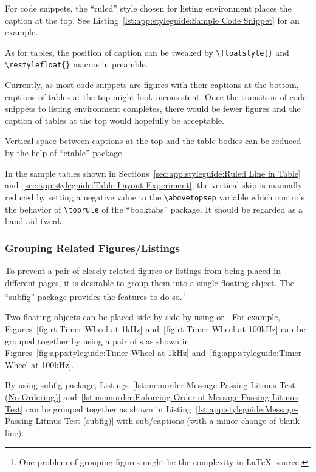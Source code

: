 For code snippets, the ``ruled'' style chosen for listing
environment places the caption at the top.
See Listing~\ref{lst:app:styleguide:Sample Code Snippet}
for an example.

As for tables, the position of caption can be tweaked by
\verb|\floatstyle{}| and \verb|\restylefloat{}| macros
in preamble.

Currently, as most code snippets are figures with their captions
at the bottom, captions of tables at the top might look inconsistent.
Once the transition of code snippets to listing environment
completes, there would be fewer figures and the caption of tables
at the top would hopefully be acceptable.

Vertical space between captions at the top and the table bodies
can be reduced by the help of ``ctable'' package.

In the sample tables shown in
Sections~\ref{sec:app:styleguide:Ruled Line in Table}
and~\ref{sec:app:styleguide:Table Layout Experiment},
the vertical skip is manually reduced by setting a negative value to the
\verb|\abovetopsep| variable which controls the behavior of
\verb|\toprule| of the ``booktabs'' package.
It should be regarded as a band-aid tweak.

\subsubsection{Grouping Related Figures/Listings}
\label{sec:app:styleguide:Grouping Related Figures/Listings}

To prevent a pair of closely related figures or listings
from being placed in different pages, it is desirable to group
them into a single floating object.
The ``subfig'' package provides the features to do so.\footnote{
  One problem of grouping figures might be the complexity in
  \LaTeX\ source.}

Two floating objects can be placed side by side by using
\co{\\parbox} or .
For example,
Figures~\ref{fig:rt:Timer Wheel at 1kHz}
and~\ref{fig:rt:Timer Wheel at 100kHz}
can be grouped together by using a pair of s
as shown in
Figures~\ref{fig:app:styleguide:Timer Wheel at 1kHz}
and~\ref{fig:app:styleguide:Timer Wheel at 100kHz}.

By using subfig package,
Listings~\ref{lst:memorder:Message-Passing Litmus Test (No Ordering)}
and~\ref{lst:memorder:Enforcing Order of Message-Passing Litmus Test}
can be grouped together as shown in
Listing~\ref{lst:app:styleguide:Message-Passing Litmus Test (subfig)}
with sub\-/captions (with a minor change of blank line).

